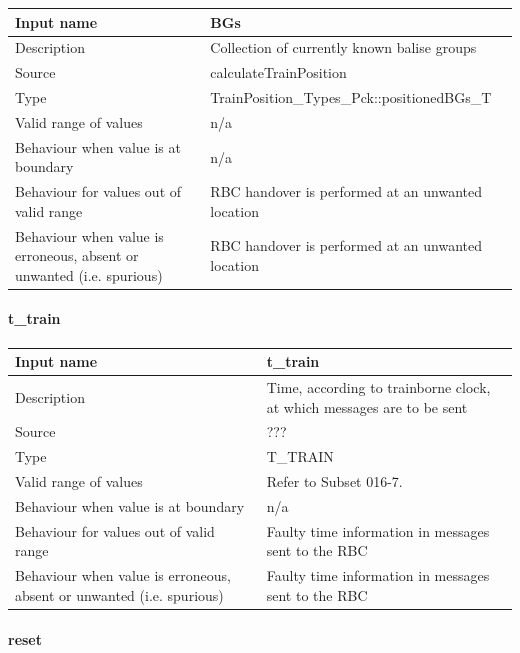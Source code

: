 \begin{longtable}{p{}p{}}
	\toprule
	Input name				& BGs \\
	\midrule
	Description				& Collection of currently known balise groups \\
	\midrule
	Source					& calculateTrainPosition \\ 
	\midrule
	Type					& TrainPosition\_Types\_Pck::positionedBGs\_T \\
	\midrule
	Valid range of values	& n/a \\
	\midrule
	Behaviour when value is at boundary	& n/a \\
	\midrule
	Behaviour for values out of valid range	& RBC handover is performed at an unwanted location \\
	\midrule
	Behaviour when value is erroneous, absent or unwanted (i.e. spurious) & RBC handover is performed at an unwanted location \\
	\bottomrule
\end{longtable}

\paragraph{t\_train}

\begin{longtable}{p{}p{}}
	\toprule
	Input name				& t\_train \\
	\midrule
	Description				& Time, according to trainborne clock, at which messages are to be sent \\
	\midrule
	Source					& ??? \\ 
	\midrule
	Type					& T\_TRAIN \\
	\midrule
	Valid range of values	& Refer to Subset 016-7. \\
	\midrule
	Behaviour when value is at boundary	& n/a \\
	\midrule
	Behaviour for values out of valid range	& Faulty time information in messages sent to the RBC \\
	\midrule
	Behaviour when value is erroneous, absent or unwanted (i.e. spurious) & Faulty time information in messages sent to the RBC \\
	\bottomrule
\end{longtable}

\paragraph{reset}

